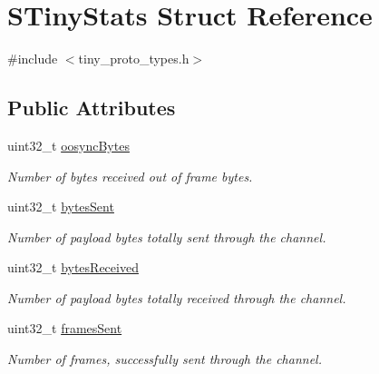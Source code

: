 \hypertarget{structSTinyStats}{}\section{S\+Tiny\+Stats Struct Reference}
\label{structSTinyStats}


{\ttfamily \#include $<$tiny\+\_\+proto\+\_\+types.\+h$>$}

\subsection*{Public Attributes}
\begin{DoxyCompactItemize}
\item 
\mbox{\label{structSTinyStats_a79119146606964d4e3345a0c019db329}} 
uint32\+\_\+t \hyperlink{structSTinyStats_a79119146606964d4e3345a0c019db329}{oosync\+Bytes}
\begin{DoxyCompactList}\small\item\em Number of bytes received out of frame bytes. \end{DoxyCompactList}\item 
\mbox{\label{structSTinyStats_a3ee26fa17e5afd758b4c7f2086bc0cbc}} 
uint32\+\_\+t \hyperlink{structSTinyStats_a3ee26fa17e5afd758b4c7f2086bc0cbc}{bytes\+Sent}
\begin{DoxyCompactList}\small\item\em Number of payload bytes totally sent through the channel. \end{DoxyCompactList}\item 
\mbox{\label{structSTinyStats_ab58c342d0fc862c193bff6f71dc725ac}} 
uint32\+\_\+t \hyperlink{structSTinyStats_ab58c342d0fc862c193bff6f71dc725ac}{bytes\+Received}
\begin{DoxyCompactList}\small\item\em Number of payload bytes totally received through the channel. \end{DoxyCompactList}\item 
\mbox{\label{structSTinyStats_a0bc110aa81a7dea0d0d64e359fb06dc3}} 
uint32\+\_\+t \hyperlink{structSTinyStats_a0bc110aa81a7dea0d0d64e359fb06dc3}{frames\+Sent}
\begin{DoxyCompactList}\small\item\em Number of frames, successfully sent through the channel. \end{DoxyCompactList}\item 

\end{DoxyCompactItemize}
